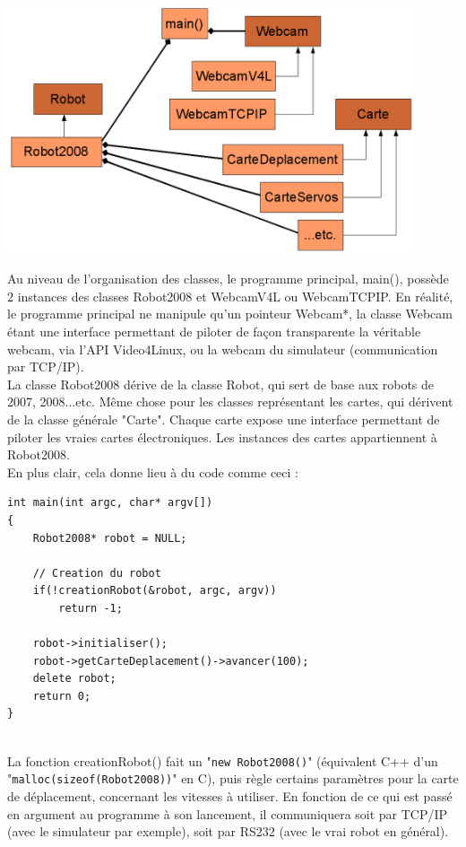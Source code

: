\begin{center}
\includegraphics[width=12cm]{images/architecture_2.png}\\
\end{center}
\indent Au niveau de l'organisation des classes, le programme principal, main(), possède 2 instances des classes Robot2008 et WebcamV4L ou WebcamTCPIP. En réalité, le programme principal ne manipule qu'un pointeur Webcam*, la classe Webcam étant une interface permettant de piloter de façon transparente la véritable webcam, via l'API Video4Linux, ou la webcam du simulateur (communication par TCP/IP).\\
\indent La classe Robot2008 dérive de la classe Robot, qui sert de base aux robots de 2007, 2008...etc. Même chose pour les classes représentant les cartes, qui dérivent de la classe générale "Carte". Chaque carte expose une interface permettant de piloter les vraies cartes électroniques. Les instances des cartes appartiennent à Robot2008.\\
En plus clair, cela donne lieu à du code comme ceci :
\begin{lstlisting}
int main(int argc, char* argv[])
{
	Robot2008* robot = NULL;

	// Creation du robot
	if(!creationRobot(&robot, argc, argv))
		return -1;

	robot->initialiser();
	robot->getCarteDeplacement()->avancer(100);
	delete robot;
	return 0;
}
	
\end{lstlisting}

La fonction creationRobot() fait un "\lstinline{new Robot2008()}" (équivalent C++ d'un "\lstinline{malloc(sizeof(Robot2008))}" en C), puis règle certains paramètres pour la carte de déplacement, concernant les vitesses à utiliser. En fonction de ce qui est passé en argument au programme à son lancement, il communiquera soit par TCP/IP (avec le simulateur par exemple), soit par RS232 (avec le vrai robot en général).